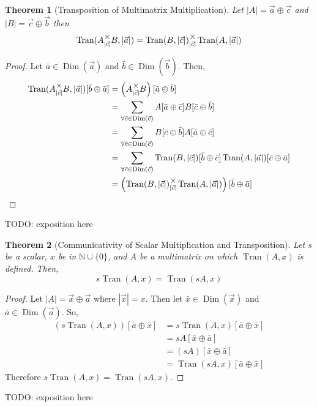 \documentclass[12pt]{book}
\theoremstyle{plain}
\newtheorem{theorem}{Theorem}[chapter]
\theoremstyle{definition}
\theoremstyle{ppart}
\theoremstyle{case}
\theoremstyle{solution}
\DeclareMathOperator{\Dim}{Dim}
\DeclareMathOperator{\Tran}{Tran}
\newcommand{\mmult}[1]{\text{\raisebox{1ex}{$\underset{#1}{\times}$}}}
\begin{document}
\begin{theorem}[Transposition of Multimatrix Multiplication]
\label{mm_tran_mult}
Let $|A| = \vec{a} \oplus \vec{c}$ and $|B| = \vec{c} \oplus \vec{b}$ then
\[
 \Tran(A \mmult{|\vec{c}|} B, |\vec{a}|)
 =  \Tran(B, |\vec{c}|) \mmult{|\vec{c}|} \Tran(A, |\vec{a}|)
\]
\end{theorem}
\begin{proof}
Let $\bar{a} \in \Dim(\vec{a})$ and $\bar{b} \in \Dim(\vec{b})$.
Then,
\begin{align*}
	\Tran(A \mmult{|\vec{c}|} B, |\vec{a}|)[\bar{b} \oplus \bar{a}]
	&=
	\left(A \mmult{|\vec{c}|} B \right)[\bar{a} \oplus \bar{b}] \\
	&=
	\sum_{\forall \bar{c} \in \Dim(\vec{c})}
	A[\bar{a} \oplus \bar{c}] B[\bar{c} \oplus \bar{b}] \\
	&=
	\sum_{\forall \bar{c} \in \Dim(\vec{c})}
	B[\bar{c} \oplus \bar{b}] A[\bar{a} \oplus \bar{c}] \\
	&=
	\sum_{\forall \bar{c} \in \Dim(\vec{c})}
	\Tran(B, |\vec{c}|)[\bar{b} \oplus \bar{c}]
	\Tran(A, |\vec{a}|)[\bar{c} \oplus \bar{a}] \\
	&=
	\left(\Tran(B, |\vec{c}|) \mmult{|\vec{c}|} \Tran(A, |\vec{a}|) \right)
	[\bar{b} \oplus \bar{a}]
\end{align*}
\end{proof}

TODO: exposition here

\begin{theorem}[Communicativity of Scalar Multiplication and Transposition]
Let $s$ be a scalar, $x$ be in $\mathbb{N} \cup \{0\}$, and $A$ be
a multimatrix on which $\Tran(A, x)$ is defined. Then,
\[ s\Tran(A, x) = \Tran(sA, x) \]
\end{theorem}
\begin{proof}
Let $|A| = \vec{x} \oplus \vec{a}$ where $|\vec{x}| = x$. Then
let $\bar{x} \in \Dim(\vec{x})$ and $\bar{a} \in \Dim(\vec{a})$. So,
\begin{align*}
  (s\Tran(A, x))[\bar{a} \oplus \bar{x}]
  &= s \Tran(A, x)[\bar{a} \oplus \bar{x}] \\
  &= s A[\bar{x} \oplus \bar{a}] \\
  &= (s A)[\bar{x} \oplus \bar{a}] \\
  &= \Tran(sA, x)[\bar{a} \oplus \bar{x}]
\end{align*}
Therefore $s\Tran(A, x) = \Tran(sA, x)$.
\end{proof}

TODO: exposition here
\end{document}
